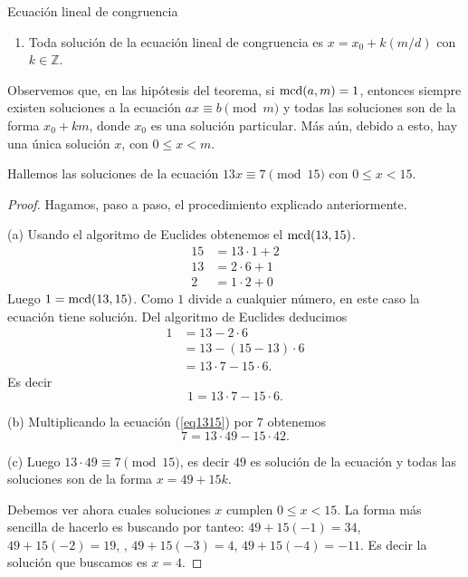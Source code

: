 \begin{section}{Ecuación lineal de congruencia}
\begin{enumerate}[label=\textit{\alph*)}]
Luego $x_0 = rt$ es solución de la ecuación lineal de congruencia. 
\item  Toda solución de la ecuación lineal de congruencia es $x= x_0+ k(m/d)$ con $k \in \mathbb Z$.
\end{enumerate}


Observemos que, en las hipótesis del teorema, si $\operatorname{mcd}(a,m) =1$, entonces siempre existen soluciones a la ecuación $ax\equiv b\pmod m$ y todas las soluciones son de la forma $x_0+km$, donde $x_0$ es una solución particular. Más aún, debido a esto, hay una única solución $x$, con $ 0\le x < m$. 



\begin{ejemplo*} Hallemos las soluciones de la ecuación $13x\equiv 7 \pmod{15}$ con $0\le x< 15$.
\end{ejemplo*}
\begin{proof}
Hagamos, paso a paso, el procedimiento explicado anteriormente.

(a) 
Usando  el algoritmo de Euclides obtenemos el  $\operatorname{mcd}(13,15)$.
\begin{align*}
15 &=  13 \cdot 1 + 2 \\
13 &= 2 \cdot 6 + 1 \\
2 &= 1 \cdot 2 + 0
\end{align*}
Luego $1 = \operatorname{mcd}(13,15)$. Como $1$ divide a cualquier número, en este caso  la ecuación tiene solución. Del algoritmo de Euclides deducimos 
\begin{align*}
1 &= 13 - 2 \cdot 6\\
&= 13 - (15-13) \cdot 6  \\
&= 13\cdot 7 - 15\cdot 6. 
\end{align*}
Es decir
\begin{equation}\label{eq1315}
1 = 13\cdot 7 - 15\cdot 6. 
\end{equation}

(b) Multiplicando la ecuación (\ref{eq1315}) por $7$ obtenemos
$$
7 = 13\cdot 49 - 15\cdot 42. 
$$


(c) Luego $13 \cdot 49 \equiv 7 \pmod{15}$, es decir $49$ es solución de la ecuación y todas las soluciones son de la forma 
 $x=49 + 15k$.

Debemos ver ahora cuales soluciones $x$ cumplen $0\le x< 15$. La forma más sencilla de hacerlo es buscando por tanteo: $49+15(-1)=34$, $49+15(-2)=19$, , $49+15(-3)=4$, $49+15(-4)=-11$.
Es decir la solución que buscamos es $x=4$.  
\end{proof}





\end{section}
